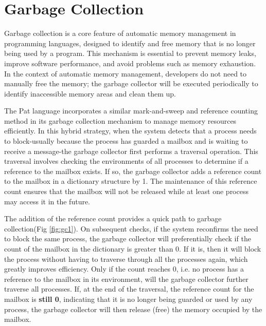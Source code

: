 \documentclass{l4proj}
\begin{document}
\section{Garbage Collection}

Garbage collection is a core feature of automatic memory management in programming languages, designed to identify and free memory that is no longer being used by a program. This mechanism is essential to prevent memory leaks, improve software performance, and avoid problems such as memory exhaustion. In the context of automatic memory management, developers do not need to manually free the memory; the garbage collector will be executed periodically to identify inaccessible memory areas and clean them up.

The Pat language incorporates a similar mark-and-sweep and reference counting method in its garbage collection mechanism to manage memory resources efficiently. In this hybrid strategy, when the system detects that a process needs to block-usually because the process has guarded a mailbox and is waiting to receive a message-the garbage collector first performs a traversal operation. This traversal involves checking the environments of all processes to determine if a reference to the mailbox exists. If so, the garbage collector adds a reference count to the mailbox in a dictionary structure by 1. The maintenance of this reference count ensures that the mailbox will not be released while at least one process may access it in the future.

The addition of the reference count provides a quick path to garbage collection(Fig \ref{fig:gc1}). On subsequent checks, if the system reconfirms the need to block the same process, the garbage collector will preferentially check if the count of the mailbox in the dictionary is greater than 0. If it is, then it will block the process without having to traverse through all the processes again, which greatly improves efficiency. Only if the count reaches 0, i.e. no process has a reference to the mailbox in its environment, will the garbage collector further traverse all processes. If, at the end of the traversal, the reference count for the mailbox is \textbf{still 0}, indicating that it is no longer being guarded or used by any process, the garbage collector will then release (free) the memory occupied by the mailbox.
\end{document}
